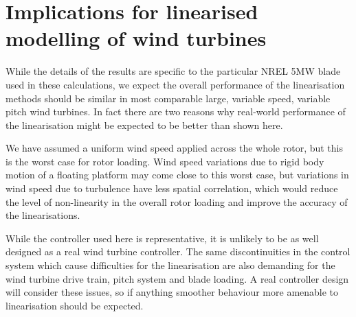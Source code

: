 \documentclass[a4paper,preprint]{elsarticle}
\begin{document}

\section{Implications for linearised modelling of wind turbines}
\label{sec:discussion}

While the details of the results are specific to the particular NREL 5MW blade
used in these calculations, we expect the overall performance of the
linearisation methods should be similar in most comparable large, variable
speed, variable pitch wind turbines. In fact there are two reasons why
real-world performance of the linearisation might be expected to be better than
shown here.

We have assumed a uniform wind speed applied across the whole rotor, but this is
the worst case for rotor loading. Wind speed variations due to rigid body motion
of a floating platform may come close to this worst case, but variations in wind
speed due to turbulence have less spatial correlation, which would reduce the
level of non-linearity in the overall rotor loading and improve the accuracy of
the linearisations.

While the controller used here is representative, it is unlikely to be as well
designed as a real wind turbine controller. The same discontinuities in the
control system which cause difficulties for the linearisation are also demanding
for the wind turbine drive train, pitch system and blade loading. A real
controller design will consider these issues, so if anything smoother behaviour
more amenable to linearisation should be expected.
\end{document}
